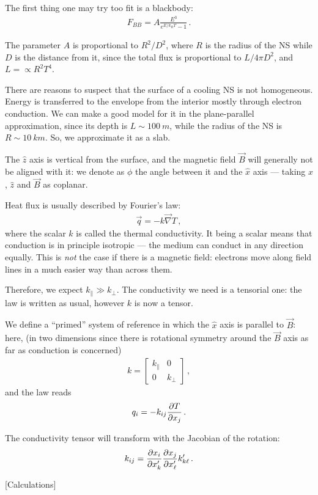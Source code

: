 \documentclass[main.tex]{subfiles}
\begin{document}
The first thing one may try too fit is a blackbody: 
%
\begin{align}
F_{BB} = A \frac{E^3}{e^{E / k_B T} - 1}
\,.
\end{align}

The parameter \(A\) is proportional to \(R^2 / D^2\), where \(R\) is the radius of the NS while \(D\) is the distance from it, since
the total flux is proportional to \(L / 4 \pi D^2\), and \(L = \propto R^2 T^{4}\).

There are reasons to suspect that the surface of a cooling NS is not homogeneous. 
Energy is transferred to the envelope from the interior mostly through electron conduction. 
We can make a good model for it in the plane-parallel approximation, since its depth is \(L \sim \SI{100}{m}\), while the radius of the NS is \(R \sim \SI{10}{km}\).
So, we approximate it as a slab.

The \(\hat{z}\) axis is vertical from the surface, and the magnetic field \(\vec{B}\) will generally not be aligned with it: we denote as \(\phi \) the angle between it and the \(\hat{x}\) axis --- taking \(\hat{x}\), \(\hat{z}\) and \(\vec{B}\) as coplanar. 

Heat flux is usually described by Fourier's law: 
%
\begin{align}
\vec{q} = - k \vec{\nabla} T
\,,
\end{align}
%
where the scalar \(k\) is called the thermal conductivity. 
It being a scalar means that conduction is in principle isotropic --- the medium can conduct in any direction equally.
This is \emph{not} the case if there is a magnetic field: electrons move along field lines in a much easier way than across them. 

Therefore, we expect \(k_\parallel \gg k_\perp\). 
The conductivity we need is a tensorial one: the law is written as usual, however \(k\) is now a tensor.

We define a ``primed'' system of reference in which the \(\hat{x}\) axis is parallel to \(\vec{B}\): here, (in two dimensions since there is rotational symmetry around the \(\vec{B}\) axis as far as conduction is concerned)
%
\begin{align}
k = \left[\begin{array}{cc}
k_\parallel & 0 \\ 
0 & k_\perp
\end{array}\right]
\,,
\end{align}
%
and the law reads 
%
\begin{align}
q_i = - k_{ij} \pdv{T}{x_j}
\,.
\end{align}

The conductivity tensor will transform with the Jacobian of the rotation: 
%
\begin{align}
k_{ij} = \pdv{x_i}{x'_k} \pdv{x_j}{x'_\ell} k'_{k \ell}
\,.
\end{align}

[Calculations]
\end{document}
